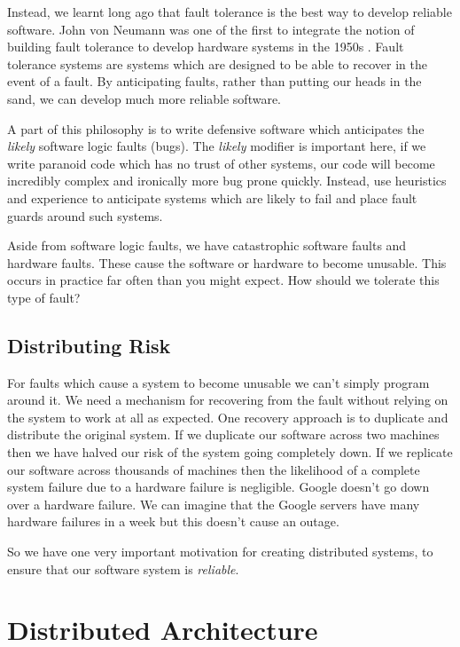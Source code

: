 Instead, we learnt long ago that fault tolerance is the best way to develop reliable software.
John von Neumann was one of the first to integrate the notion of building fault tolerance to develop hardware systems in the 1950s \cite{neumann-faults}.
Fault tolerance systems are systems which are designed to be able to recover in the event of a fault.
By anticipating faults, rather than putting our heads in the sand,
we can develop much more reliable software.

A part of this philosophy is to write defensive software which anticipates the \textsl{likely} software logic faults (bugs).
The \textsl{likely} modifier is important here,
if we write paranoid code which has no trust of other systems,
our code will become incredibly complex and ironically more bug prone quickly.
Instead, use heuristics and experience to anticipate systems which are likely to fail and place fault guards around such systems.

Aside from software logic faults,
we have catastrophic software faults and hardware faults.
These cause the software or hardware to become unusable.
This occurs in practice far often than you might expect.
How should we tolerate this type of fault?

\subsection{Distributing Risk}
For faults which cause a system to become unusable we can't simply program around it.
We need a mechanism for recovering from the fault without relying on the system to work at all as expected.
One recovery approach is to duplicate and distribute the original system.
If we duplicate our software across two machines then we have halved our risk of the system going completely down.
If we replicate our software across thousands of machines then the likelihood of a complete system failure due to a hardware failure is negligible.
Google doesn't go down over a hardware failure.
We can imagine that the Google servers have many hardware failures in a week but this doesn't cause an outage.

So we have one very important motivation for creating distributed systems,
to ensure that our software system is \textsl{reliable}.

\section{Distributed Architecture}

